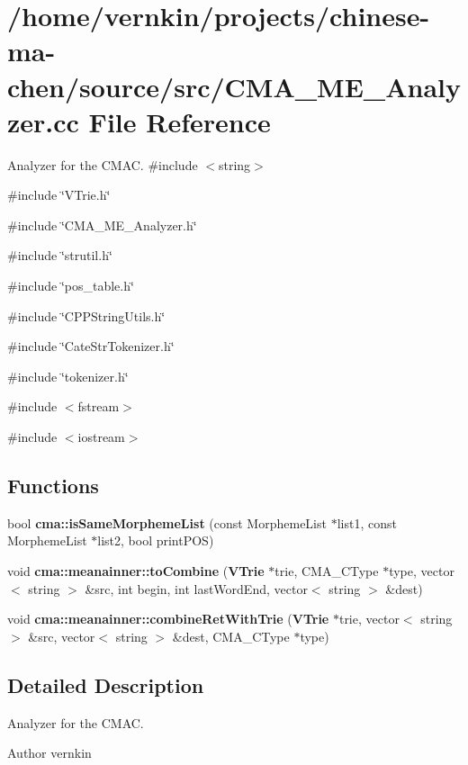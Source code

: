 \section{/home/vernkin/projects/chinese-\/ma-\/chen/source/src/CMA\_\-ME\_\-Analyzer.cc File Reference}
\label{CMA__ME__Analyzer_8cc}


Analyzer for the CMAC.  
{\ttfamily \#include $<$string$>$}\par
{\ttfamily \#include \char`\"{}VTrie.h\char`\"{}}\par
{\ttfamily \#include \char`\"{}CMA\_\-ME\_\-Analyzer.h\char`\"{}}\par
{\ttfamily \#include \char`\"{}strutil.h\char`\"{}}\par
{\ttfamily \#include \char`\"{}pos\_\-table.h\char`\"{}}\par
{\ttfamily \#include \char`\"{}CPPStringUtils.h\char`\"{}}\par
{\ttfamily \#include \char`\"{}CateStrTokenizer.h\char`\"{}}\par
{\ttfamily \#include \char`\"{}tokenizer.h\char`\"{}}\par
{\ttfamily \#include $<$fstream$>$}\par
{\ttfamily \#include $<$iostream$>$}\par
\subsection*{Functions}
\begin{DoxyCompactItemize}
\item 
bool {\bf cma::isSameMorphemeList} (const MorphemeList $\ast$list1, const MorphemeList $\ast$list2, bool printPOS)
\item 
void {\bf cma::meanainner::toCombine} ({\bf VTrie} $\ast$trie, CMA\_\-CType $\ast$type, vector$<$ string $>$ \&src, int begin, int lastWordEnd, vector$<$ string $>$ \&dest)
\item 
void {\bfseries cma::meanainner::combineRetWithTrie} ({\bf VTrie} $\ast$trie, vector$<$ string $>$ \&src, vector$<$ string $>$ \&dest, CMA\_\-CType $\ast$type)\label{namespacecma_1_1meanainner_aaba0478eb017501ee85814fcbc0486fa}

\end{DoxyCompactItemize}


\subsection{Detailed Description}
Analyzer for the CMAC. \begin{DoxyAuthor}{Author}
vernkin 
\end{DoxyAuthor}
